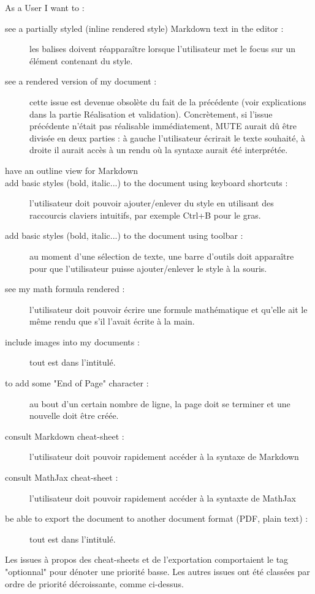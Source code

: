 \documentclass[12pt]{article}
\begin{document}
As a User I want to :
\begin{description}
    \item [see a partially styled (inline rendered style) Markdown text in the editor :]les balises doivent réapparaître lorsque l'utilisateur met le focus sur un élément contenant du style.
    \item [see a rendered version of my document :]cette issue est devenue obsolète du fait de la précédente (voir explications dans la partie Réalisation et validation). Concrètement, si l'issue précédente n'était pas réalisable immédiatement, MUTE aurait dû être divisée en deux parties : à gauche l'utilisateur écrirait le texte souhaité, à droite il aurait accès à un rendu où la syntaxe aurait été interprétée.
    \item [have an outline view for Markdown]
    \item [add basic styles (bold, italic...) to the document using keyboard shortcuts :]l'utilisateur doit pouvoir ajouter/enlever du style en utilisant des raccourcis claviers intuitifs, par exemple Ctrl+B pour le gras.
    \item [add basic styles (bold, italic...) to the document using toolbar :]au moment d'une sélection de texte, une barre d'outils doit apparaître pour que l'utilisateur puisse ajouter/enlever le style à la souris.
    \item [see my math formula rendered :]l'utilisateur doit pouvoir écrire une formule mathématique et qu'elle ait le même rendu que s'il l'avait écrite à la main.
    \item [include images into my documents :]tout est dans l'intitulé.
    \item [to add some "End of Page" character :]au bout d'un certain nombre de ligne, la page doit se terminer et une nouvelle doit être créée.
    \item [consult Markdown cheat-sheet :]l'utilisateur doit pouvoir rapidement accéder à la syntaxe de Markdown
    \item [consult MathJax cheat-sheet :]l'utilisateur doit pouvoir rapidement accéder à la syntaxte de MathJax
    \item [be able to export the document to another document format (PDF, plain text) :]tout est dans l'intitulé.\\
\end{description}

Les issues à propos des cheat-sheets et de l'exportation comportaient le tag "optionnal" pour dénoter une priorité basse. Les autres issues ont été classées par ordre de priorité décroissante, comme ci-dessus.
\end{document}
